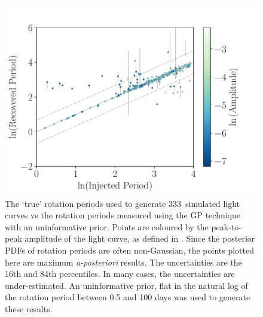 \documentclass[a4paper,fleqn,usenatbib,useAMS]{mnras}
\newcommand{\naigrain}{333}
\begin{document}
\begin{figure}
\begin{center}
\includegraphics[width=6in, clip=true]{figures/comparison_noprior_02_13.pdf}
\caption{The `true' rotation periods used to generate \naigrain\
simulated light curves vs the rotation periods measured using the GP
technique with an uninformative prior.
    Points are coloured by the peak-to-peak amplitude of the light curve, as
    defined in \citet{Aigrain2015}.
Since the posterior PDFs of rotation periods are often non-Gaussian,
    the points plotted here are maximum {\it a-posteriori} results.
The uncertainties are the 16th and 84th percentiles.
In many cases, the uncertainties are under-estimated.
An uninformative prior, flat in the natural log of the rotation period between
    0.5 and 100 days was used to generate these results.
    }
\label{fig:compare_mcmc_noprior}
\end{center}
\end{figure}
\end{document}
